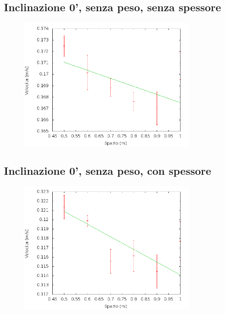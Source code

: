 \documentclass[12pt]{article} %
\begin{document}
	\subsection {Inclinazione 0', senza peso, senza spessore}
	\begin{figure}[H]
		\centering
		\includegraphics[width=0.8\textwidth]{velocita_0gradi_normale}
		\label{fig:0n}
	\end{figure}
	
	\subsection {Inclinazione 0', senza peso, con spessore}
	\begin{figure}[H]
		\centering
		\includegraphics[width=0.8\textwidth]{velocita_0gradi_alluminio}
		\label{fig:0a}
	\end{figure}
 
 
\end{document}
